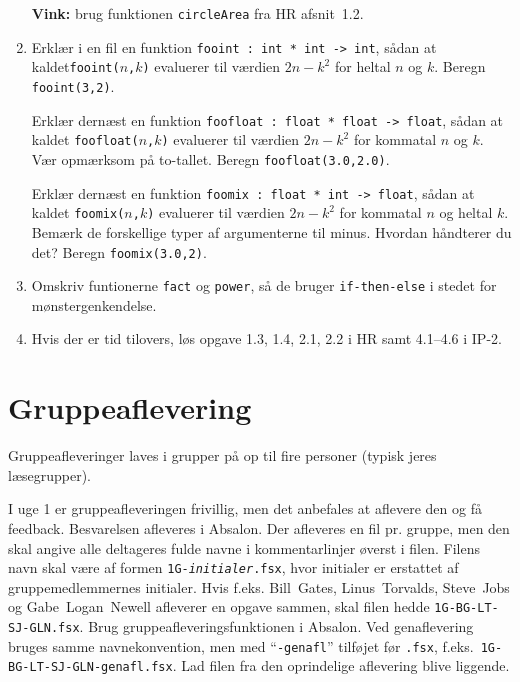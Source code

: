 \documentclass[a4paper,12pt]{article}
\begin{document}
\begin{enumerate}[{1}T1]
  \textbf{Vink:} brug funktionen \verb|circleArea| fra HR afsnit~1.2.
\item Erklær i en fil en funktion \verb|fooint : int * int -> int|,
  sådan at kaldet\newline \texttt{fooint($n$,$k$)} evaluerer til værdien $2n - k^2$ for heltal
  $n$ og $k$. Beregn \verb|fooint(3,2)|.

  Erklær dernæst en funktion \verb|foofloat : float * float -> float|,
  sådan at kaldet \texttt{foofloat($n$,$k$)} evaluerer til værdien $2n-k^2$
  for kommatal $n$ og $k$. Vær opmærksom på to-tallet. Beregn
  \verb|foofloat(3.0,2.0)|.

  Erklær dernæst en funktion \verb|foomix : float * int -> float|, sådan
  at kaldet \texttt{foomix($n$,$k$)} evaluerer til værdien $2n - k^2$ for
  kommatal $n$ og heltal $k$. Bemærk de forskellige typer af argumenterne
  til minus. Hvordan håndterer du det? Beregn \verb|foomix(3.0,2)|.

\item Omskriv funtionerne \texttt{fact} og \texttt{power}, så de
  bruger \texttt{if-then-else} i stedet for mønstergenkendelse.

\item Hvis der er tid tilovers, løs opgave 1.3, 1.4, 2.1, 2.2 i
  HR samt 4.1--4.6 i IP-2.
\end{enumerate}

\section{Gruppeaflevering}
\label{sec:gruppeaflevering}

Gruppeafleveringer laves i grupper på op til fire personer (typisk
jeres læsegrupper).

I uge 1 er gruppeafleveringen frivillig, men det anbefales at aflevere
den og få feedback. Besvarelsen afleveres i Absalon. Der afleveres en
fil pr. gruppe, men den skal angive alle deltageres fulde navne i
kommentarlinjer øverst i filen. Filens navn skal være af formen
\texttt{1G-\textit{initialer}.fsx}, hvor initialer er erstattet af
gruppemedlemmernes initialer. Hvis f.eks. Bill~Gates, Linus~Torvalds,
Steve~Jobs og Gabe~Logan~Newell afleverer en opgave sammen, skal filen
hedde \texttt{1G-BG-LT-SJ-GLN.fsx}. Brug gruppeafleveringsfunktionen i
Absalon.  Ved genaflevering bruges samme navnekonvention, men med
``\texttt{-genafl}'' tilføjet før \texttt{.fsx},
f.eks.\ \texttt{1G-BG-LT-SJ-GLN-genafl.fsx}.  Lad filen fra den
oprindelige aflevering blive liggende.
\end{document}
